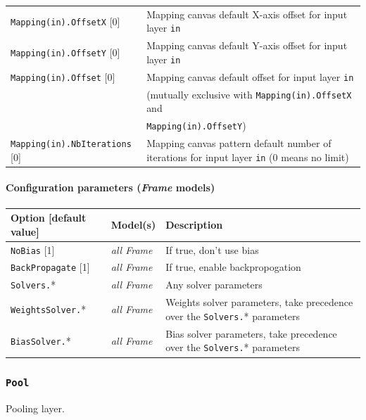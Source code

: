 \documentclass[a4paper,11pt,oneside]{article}
\begin{document}
\begin{center}
\begin{longtable}{| p{5cm} | p{10cm} | }
  \lstinline!Mapping(in).OffsetX! [0] & Mapping canvas default X-axis offset
  for input layer \lstinline!in! \\
  \lstinline!Mapping(in).OffsetY! [0] & Mapping canvas default Y-axis offset
  for input layer \lstinline!in! \\
  \lstinline!Mapping(in).Offset! [0] & Mapping canvas default offset
  for input layer \lstinline!in! \\
   & (mutually exclusive with \lstinline!Mapping(in).OffsetX! and \\
   & \lstinline!Mapping(in).OffsetY!) \\
  \lstinline!Mapping(in).NbIterations! [0] & Mapping canvas pattern default
   number of iterations for input layer \lstinline!in! (0 means no limit) \\
 \hline
\end{longtable}
\end{center}

\paragraph{Configuration parameters (\emph{Frame} models)}

\begin{center}
 \begin{longtable}{| p{4cm} | p{3cm} | p{9cm} | }
 \hline
 Option [default value] & Model(s) & Description\\
 \hline\hline
  \lstinline!NoBias! [1] & \emph{all Frame} & If true, don't use bias \\
  \lstinline!BackPropagate! [1] & \emph{all Frame} & If true, enable
  backpropogation \\
  \lstinline!Solvers.!* & \emph{all Frame} & Any solver parameters \\
  \lstinline!WeightsSolver.!* & \emph{all Frame} & Weights solver parameters,
  take precedence over the \lstinline!Solvers.!* parameters \\
  \lstinline!BiasSolver.!* & \emph{all Frame} & Bias solver parameters,
  take precedence over the \lstinline!Solvers.!* parameters \\
 \hline
\end{longtable}
\end{center}


\subsubsection{\texorpdfstring{%
\lstinline[basicstyle=\ttfamily\bfseries]!Pool!}{Pool}}
Pooling layer.
\end{document}
